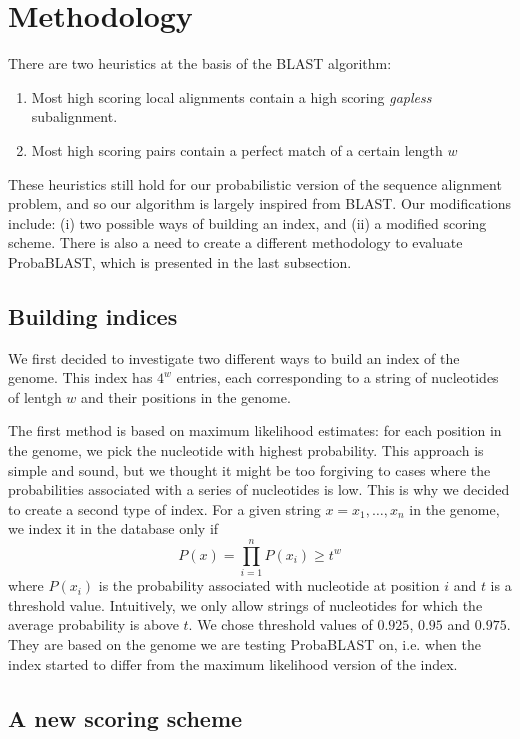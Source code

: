 \documentclass[12pt]{article}%
\begin{document}
\section{Methodology}

There are two heuristics at the basis of the BLAST algorithm:
\begin{enumerate}
\item Most high scoring local alignments contain a high scoring \emph{gapless} subalignment.
\item Most high scoring pairs contain a perfect match of a certain length $w$
\end{enumerate}
These heuristics still hold for our probabilistic version of the sequence alignment problem, and so our algorithm is largely inspired from BLAST. Our modifications include: (i) two possible ways of building an index, and (ii) a modified scoring scheme. There is also a need to create a different methodology to evaluate ProbaBLAST, which is presented in the last subsection.

\subsection{Building indices}

We first decided to investigate two different ways to build an index of the genome. This index has $4^w$ entries, each corresponding to a string of nucleotides of lentgh $w$ and their positions in the genome.

The first method is based on maximum likelihood estimates: for each position in the genome, we pick the nucleotide with highest probability. This approach is simple and sound, but we thought it might be too forgiving to cases where the probabilities associated with a series of nucleotides is low.
This is why we decided to create a second type of index. For a given string $x=x_1,\dots,x_n$ in the genome, we index it in the database only if 
$$P(x)=\prod_{i=1}^{n}P(x_i)\geq t^w$$
where $P(x_i)$ is the probability associated with nucleotide at position $i$  and $t$ is a threshold value. Intuitively, we only allow strings of nucleotides for which the average probability is above $t$. We chose threshold values of $0.925$, $0.95$ and $0.975$. They are based on the genome we are testing ProbaBLAST on, i.e. when the index started to differ from the maximum likelihood version of the index.

\subsection{A new scoring scheme}
\end{document}
